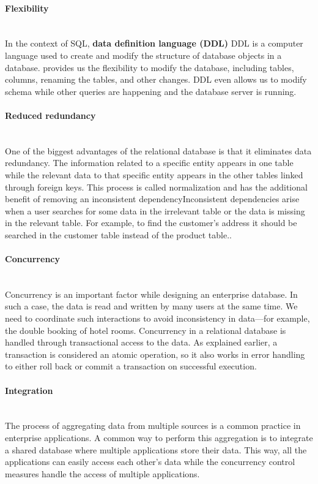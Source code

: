 \paragraph{Flexibility}\label{lst3TFxD9P-fAEX5WRRHl}
\\
In the context of SQL, \textbf{data definition language (DDL)} DDL is a computer language used to create and modify the structure of database objects in a database. provides us the flexibility to modify the database, including tables, columns, renaming the tables, and other changes. DDL even allows us to modify schema while other queries are happening and the database server is running.
\\
\paragraph{Reduced redundancy}\label{BkSogF_jlmqBzxzPP6GJg}
\\
One of the biggest advantages of the relational database is that it eliminates data redundancy. The information related to a specific entity appears in one table while the relevant data to that specific entity appears in the other tables linked through foreign keys. This process is called normalization and has the additional benefit of removing an inconsistent dependencyInconsistent dependencies arise when a user searches for some data in the irrelevant table or the data is missing in the relevant table. For example, to find the customer's address it should be searched in the customer table instead of the product table..
\\
\paragraph{Concurrency}\label{N3hTg5SHZoQB8wB7HchJ5}
\\
Concurrency is an important factor while designing an enterprise database. In such a case, the data is read and written by many users at the same time. We need to coordinate such interactions to avoid inconsistency in data---for example, the double booking of hotel rooms. Concurrency in a relational database is handled through transactional access to the data. As explained earlier, a transaction is considered an atomic operation, so it also works in error handling to either roll back or commit a transaction on successful execution.
\\
\paragraph{Integration}\label{ytS52eh63-CwKTbUjfCyJ}
\\
The process of aggregating data from multiple sources is a common practice in enterprise applications. A common way to perform this aggregation is to integrate a shared database where multiple applications store their data. This way, all the applications can easily access each other's data while the concurrency control measures handle the access of multiple applications.
\\
